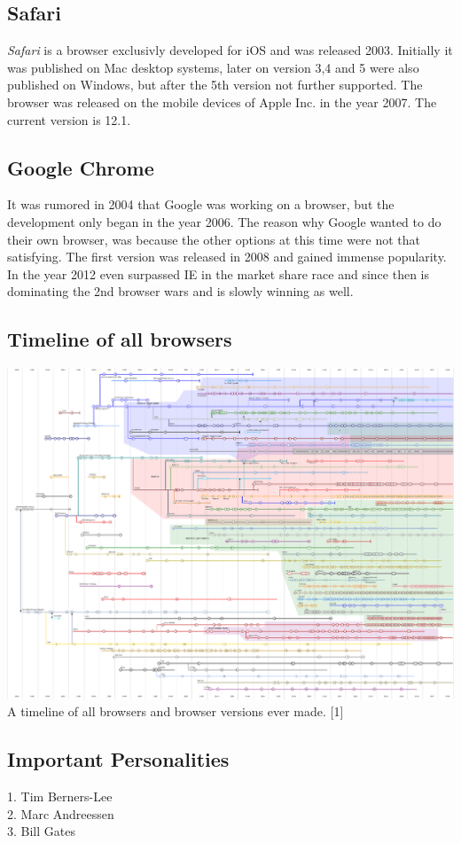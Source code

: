 \documentclass[runningheads]{llncs}
\begin{document}
		\subsection{Safari}
		\textit{Safari} is a browser exclusivly developed for iOS and was released 2003. Initially it was published on Mac desktop systems, later on version 3,4 and 5 were also published on Windows, but after the 5th version not further supported. The browser was released on the mobile devices of Apple Inc. in the year 2007. The current version is 12.1.
		\subsection{Google Chrome}
		It was rumored in 2004 that Google was working on a browser, but the development only began in the year 2006. The reason why Google wanted to do their own browser, was because the other options at this time were not that satisfying. The first version was released in 2008 and gained immense popularity. In the year 2012 even surpassed IE in the market share race and since then is dominating the 2nd browser wars and is slowly winning as well.
		\subsection{Timeline of all browsers}		\includegraphics{TimelineOfWebBrowsers.png} 
		A timeline of all browsers and browser versions ever made. [1]
		\subsection{Important Personalities}
		1. Tim Berners-Lee\\
		2. Marc Andreessen\\
		3. Bill Gates\\
\end{document}

